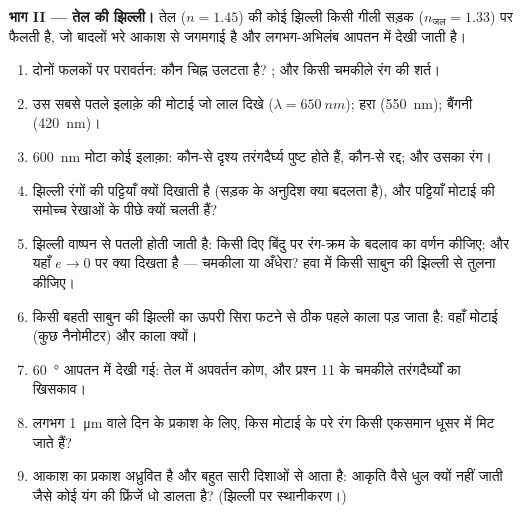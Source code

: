 \begin{problem}
\medskip
\noindent\textbf{भाग II --- तेल की झिल्ली।}
तेल ($n = 1.45$) की कोई झिल्ली किसी गीली सड़क ($n_{\text{जल}} = 1.33$) पर फैलती है,
जो बादलों भरे आकाश से जगमगाई है और लगभग-अभिलंब आपतन में देखी जाती है।
\begin{enumerate}[resume]
  \item दोनों फलकों पर परावर्तन: कौन चिह्न उलटता है? ;
        और किसी चमकीले रंग की शर्त।
  \item उस सबसे पतले इलाक़े की मोटाई जो लाल दिखे ($\lambda =
        \qty{650}{nm}$); हरा (\qty{550}{nm}); बैंगनी (\qty{420}{nm})।
  \item \qty{600}{nm} मोटा कोई इलाक़ा: कौन-से दृश्य तरंगदैर्घ्य
        पुष्ट होते हैं, कौन-से रद्द; और उसका रंग।
  \item झिल्ली रंगों की पट्टियाँ क्यों दिखाती है (सड़क के अनुदिश क्या
        बदलता है), और पट्टियाँ मोटाई की समोच्च रेखाओं के पीछे क्यों चलती हैं?
  \item झिल्ली वाष्पन से पतली होती जाती है: किसी दिए बिंदु पर रंग-क्रम
        के बदलाव का वर्णन कीजिए; और यहाँ $e \to 0$ पर क्या दिखता है
        --- चमकीला या अँधेरा? हवा में किसी साबुन की झिल्ली से तुलना कीजिए।
  \item किसी बहती साबुन की झिल्ली का ऊपरी सिरा फटने से ठीक पहले काला पड़
        जाता है: वहाँ मोटाई (कुछ नैनोमीटर) और काला क्यों।
  \item \qty{60}{\degree} आपतन में देखी गई: तेल में अपवर्तन कोण,
        और प्रश्न 11 के चमकीले तरंगदैर्घ्यों का खिसकाव।
  \item लगभग \qty{1}{\micro m}  वाले दिन के प्रकाश के लिए, किस
        मोटाई के परे रंग किसी एकसमान धूसर में मिट जाते हैं?
  \item आकाश का प्रकाश अध्रुवित है और बहुत सारी दिशाओं से आता है:
        आकृति वैसे धुल क्यों नहीं जाती जैसे कोई  यंग की
        फ्रिंजें धो डालता है? (झिल्ली पर स्थानीकरण।)
\end{enumerate}


\end{problem}
